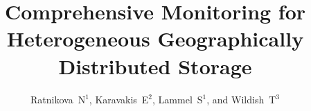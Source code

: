 \documentclass[a4paper]{jpconf}
\begin{document}
\title{Comprehensive Monitoring for Heterogeneous Geographically Distributed Storage}

\author{Ratnikova~N$^1$, Karavakis~E$^2$, Lammel~S$^1$, and Wildish~T$^3$}

\address{$^1$ Fermi National Accelerator Laboratory, US}
\address{$^2$ CERN, CH}
\address{$^3$ Princeton University, US}









% 
% 

\par

\end{document}
